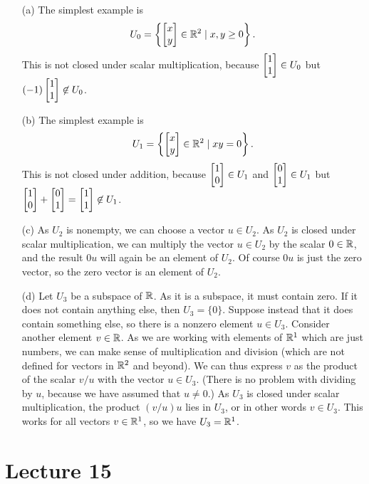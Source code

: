 \documentclass[a4paper]{amsart}
\renewenvironment{solution}{\SolutionInline}{\endSolutionInline}
\begin{document}
\begin{solution}
 \begin{itemize}
  \item[(a)] The simplest example is 
   \[ U_0=\left\{\left[\begin{matrix} x \\ y\end{matrix}\right] \in{\mathbb{R}}^2\;|\; x,y\geq 0\right\}. \]
   This is not closed under scalar multiplication, because
   $\left[\begin{matrix} 1\\ 1\end{matrix}\right]\in U_0$ but $(-1)\left[\begin{matrix} 1 \\ 1\end{matrix}\right]\not\in U_0$.
  \item[(b)] The simplest example is 
   \[ U_1=\left\{\left[\begin{matrix} x \\ y\end{matrix}\right] \in{\mathbb{R}}^2\;|\; xy=0\right\}. \]
   This is not closed under addition, because
   $\left[\begin{matrix} 1\\ 0\end{matrix}\right]\in U_1$ and $\left[\begin{matrix} 0\\1\end{matrix}\right]\in U_1$ but
   $\left[\begin{matrix} 1\\0\end{matrix}\right]+\left[\begin{matrix} 0\\1\end{matrix}\right]=\left[\begin{matrix} 1\\1\end{matrix}\right]\not\in U_1$.
  \item[(c)] As $U_2$ is nonempty, we can choose a vector $u\in U_2$.
   As $U_2$ is closed under scalar multiplication, we can multiply the
   vector $u\in U_2$ by the scalar $0\in{\mathbb{R}}$, and the result $0u$ will
   again be an element of $U_2$.  Of course $0u$ is just the zero
   vector, so the zero vector is an element of $U_2$.
  \item[(d)] Let $U_3$ be a subspace of ${\mathbb{R}}$.  As it is a subspace, it
   must contain zero.  If it does not contain anything else, then
   $U_3=\{0\}$.  Suppose instead that it does contain something else,
   so there is a nonzero element $u\in U_3$.  Consider another element
   $v\in{\mathbb{R}}$.  As we are working with elements of ${\mathbb{R}}^1$ which are just
   numbers, we can make sense of multiplication and division (which
   are not defined for vectors in ${\mathbb{R}}^2$ and beyond).  We can thus
   express $v$ as the product of the scalar $v/u$ with the vector
   $u\in U_3$.  (There is no problem with dividing by $u$, because we
   have assumed that $u\neq 0$.)  As $U_3$ is closed under scalar
   multiplication, the product $(v/u)u$ lies in $U_3$, or in other
   words $v\in U_3$.  This works for all vectors $v\in{\mathbb{R}}^1$, so we
   have $U_3={\mathbb{R}}^1$.
 \end{itemize}
\end{solution}

\section{Lecture 15}
\end{document}
